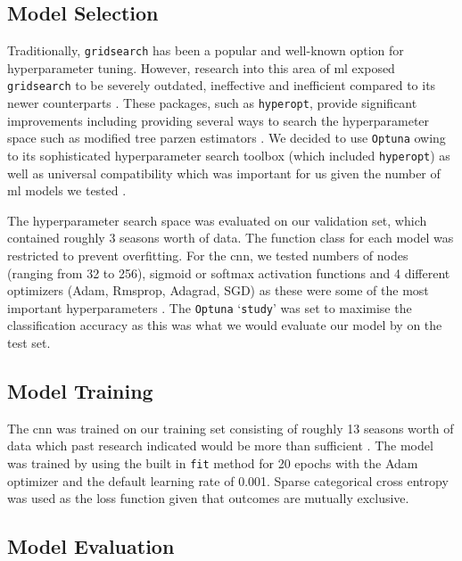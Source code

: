 \documentclass{article}
\newcommand{\sw}[1]{\texttt{#1}}
\begin{document}
\subsection{Model Selection}
\label{modelselection}

Traditionally, \sw{gridsearch} has been a popular and well-known option for hyperparameter tuning. However, research into this area of \gls{ml} exposed \sw{gridsearch} to be severely outdated, ineffective and inefficient compared to its newer counterparts \cite{hyperparamreview}. These packages, such as \sw{hyperopt}, provide significant improvements including providing several ways to search the hyperparameter space such as modified tree parzen estimators \cite{hyperopt}. We decided to use \sw{Optuna} owing to its sophisticated hyperparameter search toolbox (which included \sw{hyperopt}) as well as universal compatibility which was important for us given the number of \gls{ml} models we tested \cite{optuna}.  

The hyperparameter search space was evaluated on our validation set, which contained roughly 3 seasons worth of data. The function class for each model was restricted to prevent overfitting. For the \gls{cnn}, we tested numbers of nodes (ranging from 32 to 256), sigmoid or softmax activation functions and 4 different optimizers (Adam, Rmsprop, Adagrad, SGD) as these were some of the most important hyperparameters \cite{laumediumCNNtuning}. The \sw{Optuna} ‘\sw{study}’ was set to maximise the classification accuracy as this was what we would evaluate our model by on the test set. 

\subsection{Model Training}
\label{modeltraining}

The \gls{cnn} was trained on our training set consisting of roughly 13 seasons worth of data which past research indicated would be more than sufficient \cite{horvat2020use}. The model was trained by using the built in \sw{fit} method for 20 epochs with the Adam optimizer and the default learning rate of 0.001. Sparse categorical cross entropy was used as the loss function given that outcomes are mutually exclusive. 

\subsection{Model Evaluation}
\label{modeleval}
\end{document}
